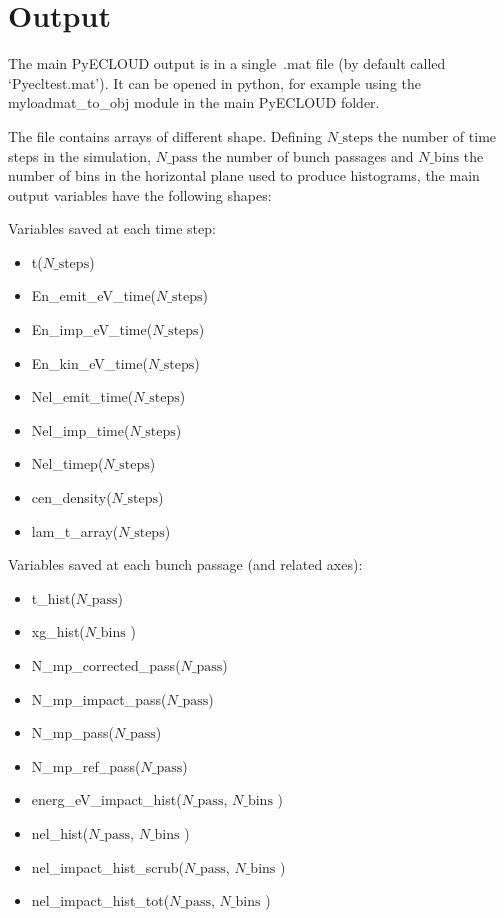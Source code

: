 \documentclass[a4paper,12pt]{article}
\begin{document}
\newpage

\section{Output}
The main PyECLOUD output is in a single~.mat file (by default called `Pyecltest.mat'). It can be opened in python, for example using the myloadmat\_to\_obj module in the main PyECLOUD folder.

The file contains arrays of different shape. Defining $N\_{\mathrm{steps}}$ the number of time steps in the simulation, $N\_{\mathrm{pass}}$ the number of bunch passages and $N\_{\mathrm{bins}}$ the number of bins in the horizontal plane used to produce histograms, the main output variables have the following shapes: \newline

Variables saved at each time step:
\begin{itemize}
\item t($N\_{\mathrm{steps}}$)
\item En\_emit\_eV\_time($N\_{\mathrm{steps}}$)
\item En\_imp\_eV\_time($N\_{\mathrm{steps}}$)
\item En\_kin\_eV\_time($N\_{\mathrm{steps}}$)
\item Nel\_emit\_time($N\_{\mathrm{steps}}$)
\item Nel\_imp\_time($N\_{\mathrm{steps}}$)
\item Nel\_timep($N\_{\mathrm{steps}}$)
\item cen\_density($N\_{\mathrm{steps}}$)
\item lam\_t\_array($N\_{\mathrm{steps}}$)
\end{itemize}

Variables saved at each bunch passage (and related axes):
\begin{itemize}
\item t\_hist($N\_{\mathrm{pass}}$)
\item xg\_hist($N\_{\mathrm{bins}}$ )
\item N\_mp\_corrected\_pass($N\_{\mathrm{pass}}$)
\item N\_mp\_impact\_pass($N\_{\mathrm{pass}}$)
\item N\_mp\_pass($N\_{\mathrm{pass}}$)
\item N\_mp\_ref\_pass($N\_{\mathrm{pass}}$)
\item energ\_eV\_impact\_hist($N\_{\mathrm{pass}}$, $N\_{\mathrm{bins}}$ )
\item nel\_hist($N\_{\mathrm{pass}}$, $N\_{\mathrm{bins}}$ )
\item nel\_impact\_hist\_scrub($N\_{\mathrm{pass}}$, $N\_{\mathrm{bins}}$ )
\item nel\_impact\_hist\_tot($N\_{\mathrm{pass}}$, $N\_{\mathrm{bins}}$ )
\end{itemize}
\end{document}
